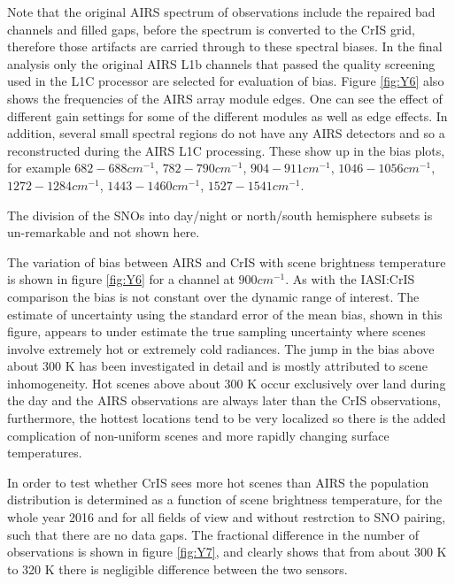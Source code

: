 \documentclass[twocolumn,10pt]{article}
\begin{document}
Note that the original AIRS spectrum of observations include the repaired bad channels and filled gaps, before the spectrum is converted to the CrIS grid, therefore those artifacts are carried through to these spectral biases. In the final analysis only the original AIRS L1b channels that passed the quality screening used in the L1C processor are selected for evaluation of bias. Figure \ref{fig:Y6} also shows the frequencies of the AIRS array module edges. One can see the effect of different gain settings for some of the different modules as well as edge effects. In addition, several small spectral regions do not have any AIRS detectors and so a reconstructed during the AIRS L1C processing. These show up in the bias plots, for example $ 682 - 688 cm^{-1} $, $ 782 - 790 cm^{-1} $, $ 904 - 911 cm^{-1} $, $ 1046 - 1056 cm^{-1} $, $ 1272 - 1284 cm^{-1} $, $ 1443 - 1460 cm^{-1} $, $ 1527 - 1541 cm^{-1} $.

The division of the SNOs into day/night or north/south hemisphere subsets is un-remarkable and not shown here.

The variation of bias between AIRS and CrIS with scene brightness temperature is shown in figure \ref{fig:Y6} for a channel at $ 900 cm^{-1} $. As with the IASI:CrIS comparison the bias is not constant over the dynamic range of interest. The estimate of uncertainty using the standard error of the mean bias, shown in this figure, appears to under estimate the true sampling uncertainty where scenes involve extremely hot or extremely cold radiances. The jump in the bias above about 300 K has been investigated in detail and is mostly attributed to scene inhomogeneity. Hot scenes above about 300 K occur exclusively over land during the day and the AIRS observations are always later than the CrIS observations, furthermore, the hottest locations tend to be very localized so there is the added complication of non-uniform scenes and more rapidly changing surface temperatures.

In order to test whether CrIS sees more hot scenes than AIRS the population distribution is determined as a function of scene brightness temperature, for the whole year 2016 and for all fields of view and without restrction to SNO pairing, such that there are no data gaps. The fractional difference in the number of observations is shown in figure \ref{fig:Y7}, and clearly shows that from about 300 K to 320 K there is negligible difference between the two sensors.  
\end{document}
